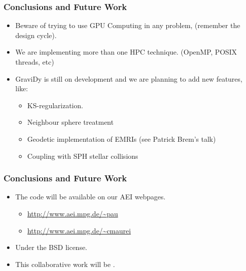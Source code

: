 \begin{frame}
    \frametitle{Conclusions and Future Work}
    \begin{itemize}
        \item Beware of trying to use GPU Computing in any problem,
            (remember the  design cycle).
        \item We are implementing more than one HPC technique.
            (OpenMP, POSIX threads, etc)
        \item GraviDy is still on development and we are planning
            to add new features, like:
        \begin{itemize}
            \item KS-regularization.
            \item Neighbour sphere treatment
            \item Geodetic implementation of EMRIs (see Patrick Brem's talk)
            \item Coupling with SPH stellar collisions
        \end{itemize}
    \end{itemize}
\end{frame}

\begin{frame}
    \frametitle{Conclusions and Future Work}
    \begin{itemize}
        \item The code will be available on our AEI webpages.
        \begin{itemize}
            \item \url{http://www.aei.mpg.de/~pau}
            \item \url{http://www.aei.mpg.de/~cmaurei}
        \end{itemize}
        \item Under the BSD license.
        \item This collaborative work will be .
    \end{itemize}
\end{frame}
